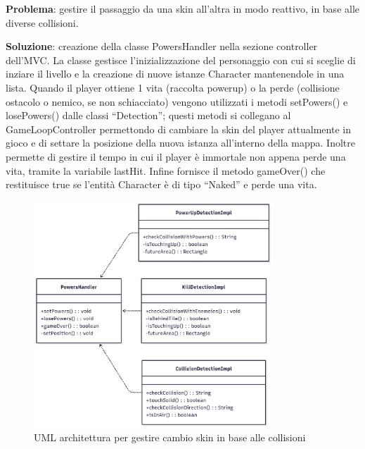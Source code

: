 \documentclass[a4paper,12pt]{report}
\begin{document}
\textbf{Problema}: gestire il passaggio da una skin all'altra in modo reattivo, in base alle diverse collisioni.

\textbf{Soluzione}: creazione della classe PowersHandler nella sezione controller dell'MVC. La classe gestisce l'inizializzazione del 
personaggio con cui si sceglie di inziare il livello e la creazione di nuove istanze Character mantenendole in una lista. Quando il player ottiene 
1 vita (raccolta powerup) o la perde (collisione ostacolo o nemico, se non schiacciato) vengono utilizzati i metodi setPowers() e 
losePowers() dalle classi “Detection”; questi metodi si collegano al GameLoopController permettondo di cambiare la skin del player 
attualmente in gioco e di settare la posizione della nuova istanza all'interno della mappa. Inoltre permette di 
gestire il tempo in cui il player è immortale non appena perde una vita, tramite la variabile lastHit.
Infine fornisce il metodo gameOver() che restituisce true se l'entità Character è di tipo “Naked” e perde una vita.

\begin{figure}
    \centering
    \includegraphics[width=0.8\textwidth]{resources/PowersHandler.png}
    \caption{UML architettura per gestire cambio skin in base alle collisioni}
    \label{fig:2.5}
\end{figure}
\end{document}

